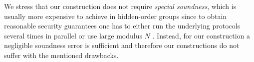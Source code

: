 

We stress that our construction does not require \emph{special soundness}, which is usually more expensive to achieve in hidden-order groups since to obtain reasonable security guarantees one has to either run the underlying protocols several times in parallel or use large modulus $N$ \cite{SPEED:BKSST}. Instead, for our construction a negligible soundness error is sufficient and therefore our constructions do not suffer with the mentioned drawbacks.

